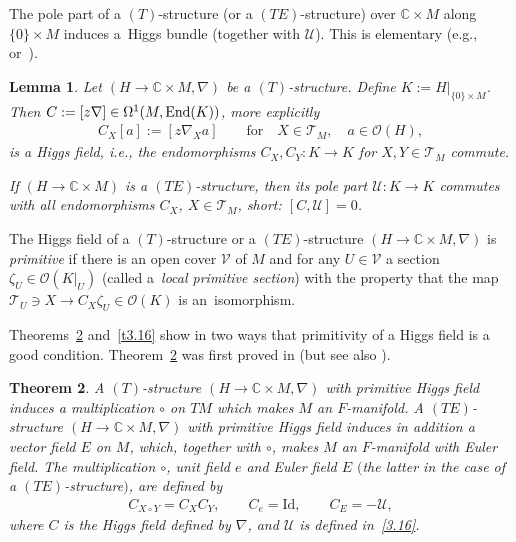 \documentclass[pdftex]{sigma}%
\numberwithin{equation}{section}
\numberwithin{figure}{section}
\newcommand{\C}{{\mathbb C}}
\newcommand{\OO}{{\mathcal O}}
\newcommand{\TT}{{\mathcal T}}
\newcommand{\UU}{{\mathcal U}}
\newcommand{\nnn}{\nabla}
\newtheorem{Theorem}{Theorem}[section]
\newtheorem{Lemma}[Theorem]{Lemma}
\begin{document}
The pole part of a $(T)$-structure (or a $(TE)$-structure)
over $\C\times M$ along $\{0\}\times M$ induces a~Higgs bundle (together with $\UU$).
This is elementary (e.g.,~\cite{DH20-1} or~\cite{He03}).

\begin{Lemma}\label{t3.12}
Let $(H\to\C\times M,\nnn)$ be a $(T)$-structure.
Define $K:=H|_{\{0\}\times M}$.
Then $C:=[z\nnn]\in\Omega^1(M,{\rm End}(K))$,
more explicitly
\begin{eqnarray}\label{3.21}
C_X[a]:= [z\nnn_X a]\qquad\text{for}\quad X\in \TT_M,\quad a\in\OO(H),
\end{eqnarray}
is a Higgs field, i.e., the endomorphisms $C_X,C_Y\colon K\to K$
for $X,Y\in\TT_M$ commute.

If $(H\to\C\times M)$ is a $(TE)$-structure,
then its pole part $\UU\colon K\to K$ commutes with all
endomorphisms $C_X$, $X\in\TT_M$, short: $[C,\UU]=0$.
\end{Lemma}


\begin{Definition}\label{t3.13}
The Higgs field of a $(T)$-structure or a $(TE)$-structure
$(H\to\C\times M,\nnn)$ is {\it primitive}
if there is an open cover $\mathcal V$ of $M$ and for any
$U\in \mathcal V$
a section $\zeta_{U}\in {\mathcal O} (K\vert_{U})$
(called a~{\it local primitive section})
with the property that the map
$\TT_U\ni X\rightarrow C_{X} \zeta_{U} \in \OO(K)$
is an~isomorphism.
\end{Definition}

Theorems~\ref{t3.14} and~\ref{t3.16} show in two ways
that primitivity of a Higgs field is a good condition.
Theorem~\ref{t3.14} was first proved in
\cite[Theorem~3.3]{HHP10} (but see also
\cite[Lemma~10]{DH20-1}).

\begin{Theorem}\label{t3.14}
A $(T)$-structure $(H\rightarrow \mathbb{C}\times M, \nabla )$
with primitive Higgs field induces a multiplication $\circ$
on $TM$ which makes $M$ an $F$-manifold.
A $(TE)$-structure $(H\rightarrow \mathbb{C}\times M, \nabla )$
with primitive Higgs field induces in addition
a vector field $E$ on $M$, which, together with $\circ$,
makes $M$ an $F$-manifold with Euler field.
The multiplication $\circ$, unit field $e$ and Euler field $E$
$($the latter in the case of a $(TE)$-structure$)$, are defined by
\begin{gather*}%
C_{X\circ Y} = C_{X} C_{Y},\qquad
C_{e} =\mathrm{Id},\qquad
C_{E} = - {\mathcal U},
\end{gather*}
where $C$ is the Higgs field defined by $\nabla$, and
$\mathcal U$ is defined in~\eqref{3.16}.
\end{Theorem}
\end{document}
